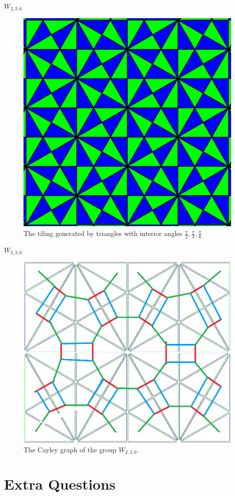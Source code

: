 \documentclass[usenames,dvipsnames]{beamer}
\begin{document}
\begin{frame}{$W_{2,3,6}$}

\begin{figure}[h]
    \centering
    \includegraphics[width=.5\textwidth]{images/7-02-W_236_cayley_graph.png}
    \caption{The tiling generated by triangles with interior angles $\frac{\pi}{2},\frac{\pi}{3},\frac{\pi}{6}$}
\end{figure}

\end{frame}

\begin{frame}{$W_{2,3,6}$}

\begin{figure}[h]
    \centering
    \includegraphics[width=.55\textwidth]{images/7-01-W_236_tiling.png}
    \caption{The Cayley graph of the group $W_{2,3,6}$.}
\end{figure}

\end{frame}

\section{Extra Questions}
\end{document}
